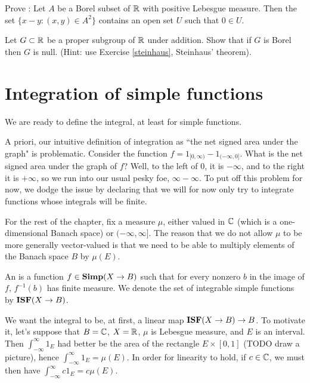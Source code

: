 \begin{exercise}
\label{steinhaus}
Prove : Let $A$ be a Borel subset of $\mathbb{R}$ with positive Lebesgue measure. Then the set $\{x - y: (x, y) \in A^2\}$ contains an open set $U$ such that $0 \in U$.
\end{exercise}

\begin{exercise}
Let $G \subset \mathbb{R}$ be a proper subgroup of $\mathbb{R}$ under addition.
Show that if $G$ is Borel then $G$ is null.
(Hint: use Exercise \ref{steinhaus}, Steinhaus' theorem).
\end{exercise}


\section{Integration of simple functions}
We are ready to define the integral, at least for simple functions.

\begin{subsec}
A priori, our intuitive definition of integration as ``the net signed area under the graph" is problematic.
Consider the function $f = 1_{[0, \infty)} - 1_{(-\infty, 0]}$. What is the net signed area under the graph of $f$? Well, to the left of $0$, it is $-\infty$, and to the right it is $+\infty$, so we run into our usual pesky foe, $\infty - \infty$.
To put off this problem for now, we dodge the issue by declaring that we will for now only try to integrate functions whose integrals will be finite.
\end{subsec}

\begin{subsec}
For the rest of the chapter, fix a measure $\mu$, either valued in $\mathbb{C}$ (which is a one-dimensional Banach space) or $(-\infty, \infty]$.
The reason that we do not allow $\mu$ to be more generally vector-valued is that we need to be able to multiply elements of the Banach space $B$ by $\mu(E)$.
\end{subsec}

\begin{definition}
An  is a function $f \in \mathbf{Simp}(X \to B)$ such that for every nonzero $b$ in the image of $f$, $f^{-1}(b)$ has finite measure.
We denote the set of integrable simple functions by $\mathbf{ISF}(X \to B)$.
\end{definition}

\begin{subsec}
We want the integral to be, at first, a linear map $\mathbf{ISF}(X \to B) \to B$.
To motivate it, let's suppose that $B = \mathbb{C}$, $X = \mathbb{R}$, $\mu$ is Lebesgue measure, and $E$ is an interval. Then $\int_{-\infty}^\infty 1_E$ had better be the area of the rectangle $E \times [0, 1]$ (TODO draw a picture), hence $\int_{-\infty}^\infty 1_E = \mu(E)$. In order for linearity to hold, if $c \in \mathbb{C}$, we must then have $\int_{-\infty}^\infty c1_E = c\mu(E)$.
\end{subsec}

